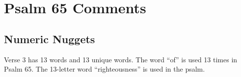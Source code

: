 \section{Psalm 65 Comments}

\subsection{Numeric Nuggets}
Verse 3 has 13 words and 13 unique words. The word ``of'' is used 13 times in Psalm 65. The 13-letter word ``righteousness'' is used in the psalm.